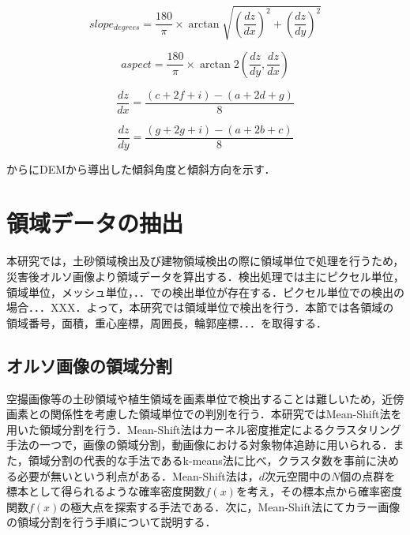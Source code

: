       \begin{equation}
        \label{傾斜角度}
        slope_{degrees} = 
        \dfrac{180} {\pi} \times 
        \arctan \sqrt{
          (\dfrac{dz}{dx})^2 + (\dfrac{dz}{dy})^2
        }
      \end{equation}

      \begin{equation}
        \label{傾斜方位}
        aspect = 
        \dfrac{180} {\pi} \times
        \arctan 2 (\dfrac{dz}{dy}, \dfrac{dz}{dx})
      \end{equation}

      \begin{equation}
        \label{X方向の変化率}
        \dfrac{dz}{dx} = 
          \dfrac {(c + 2f + i) - (a + 2d + g)} {8}
      \end{equation}

      \begin{equation}
        \label{Y方向の変化率}
        \dfrac{dz}{dy} = 
          \dfrac {(g + 2g + i) - (a + 2b + c)} {8}
      \end{equation}

    \fref{}から\fref{}にDEMから導出した傾斜角度と傾斜方向を示す．


  \section{領域データの抽出}
    本研究では，土砂領域検出及び建物領域検出の際に領域単位で処理を行うため，災害後オルソ画像より領域データを算出する．検出処理では主にピクセル単位，領域単位，メッシュ単位，．．での検出単位が存在する．ピクセル単位での検出の場合．．．XXX．よって，本研究では領域単位で検出を行う．本節では各領域の領域番号，面積，重心座標，周囲長，輪郭座標．．．を取得する．


    \subsection{オルソ画像の領域分割}
      空撮画像等の土砂領域や植生領域を画素単位で検出することは難しいため，近傍画素との関係性を考慮した領域単位での判別を行う．本研究ではMean-Shift法\cite{}を用いた領域分割を行う．Mean-Shift法はカーネル密度推定によるクラスタリング手法の一つで，画像の領域分割，動画像における対象物体追跡に用いられる．また，領域分割の代表的な手法であるk-means法\cite{}に比べ，クラスタ数を事前に決める必要が無いという利点がある．Mean-Shift法は，$d$次元空間中の$N$個の点群を標本として得られるような確率密度関数$f(x)$を考え，その標本点から確率密度関数$f(x)$の極大点を探索する手法である．次に，Mean-Shift法にてカラー画像の領域分割を行う手順について説明する．

